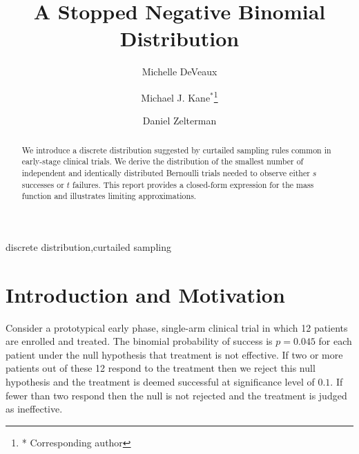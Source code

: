 \documentclass[review]{elsarticle}
\begin{document}
\begin{frontmatter}

\title{A Stopped Negative Binomial Distribution}


\author{Michelle DeVeaux}

\author{Michael J. Kane$^*$\footnote{* Corresponding author}}

\author{Daniel Zelterman}

\address{Department of Biostatistics\\ School of Epidemiology and Public Health\\ Yale University, New Haven, CT}

\begin{abstract}
We introduce a discrete distribution suggested by curtailed
sampling rules common in early-stage clinical trials. We derive the
distribution of the smallest number of independent and identically
distributed Bernoulli trials needed to observe either $s$ successes 
or $t$ failures. This report provides a closed-form expression for the 
mass function and illustrates limiting approximations.
\end{abstract}

\begin{keyword}
discrete distribution\sep curtailed sampling
\end{keyword}

\end{frontmatter}

\linenumbers

\section{Introduction and Motivation}

Consider a prototypical early phase, single-arm clinical trial in which 
12 patients
are enrolled and treated. The binomial probability of success is $p=0.045$ for
each patient under the null hypothesis that treatment is not effective.
If two or more patients out of these 12 respond to the treatment then we 
reject this null
hypothesis and the treatment is deemed successful at significance 
level of $0.1$.  If fewer than two respond then the null is not rejected
and the treatment is judged as ineffective.
\end{document}
